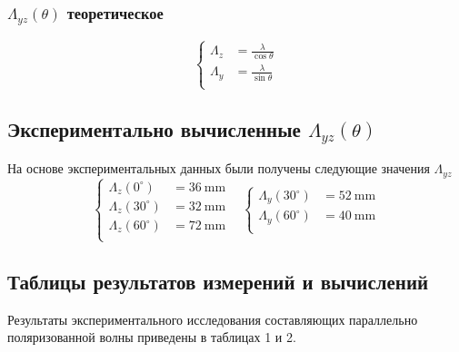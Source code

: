 \documentclass[11pt,a4paper,oneside, titlepage,reqno]{amsproc}
\begin{document}
\subsubsection{$\Lambda_{yz}(\theta)$ теоретическое}
\begin{equation}
    \left\{
    \begin{aligned}
    \Lambda_z &= \frac{\lambda}{\cos\theta}\\
    \Lambda_y &= \frac{\lambda}{\sin\theta}\\
    \end{aligned}
    \right.
    \label{eq:lambdas}
\end{equation}

\subsection{Экспериментально вычисленные $\Lambda_{yz}(\theta)$}
На основе экспериментальных данных были получены следующие значения $\Lambda_{yz}$
\begin{equation}
    \left\{
    \begin{aligned}
        \Lambda_z(0^\circ) &= 36~\text{mm}\\
        \Lambda_z(30^\circ) &= 32~\text{mm}\\
        \Lambda_z(60^\circ) &= 72~\text{mm}\\
    \end{aligned}
    \right.
    ~ ~ ~ ~ 
    \left\{
    \begin{aligned}
        \Lambda_y(30^\circ) &= 52~\text{mm}\\
        \Lambda_y(60^\circ) &= 40~\text{mm}\\
    \end{aligned}
    \right.
    \label{eq:experimental}
\end{equation}
\vspace{6pt}

\subsection{Таблицы результатов измерений и вычислений}
Результаты экспериментального исследования составляющих параллельно поляризованной волны
приведены в таблицах 1 и 2.
\end{document}

